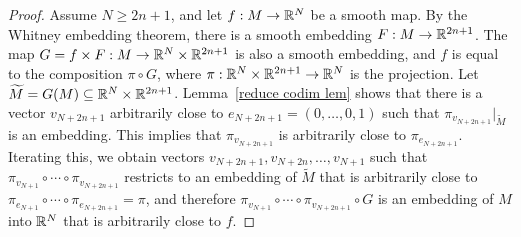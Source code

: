 \begin{proof}
Assume $N\geq2n+1$, and let $f:M\to\mathbb{R}^N$ be a smooth map. By the Whitney embedding theorem, there is a smooth embedding $F:M\to\mathbb{R}^{2n+1}$. The map $G=f\times F:M\to\mathbb{R}^N\times\mathbb{R}^{2n+1}$ is also a smooth embedding, and $f$ is equal to the composition $\pi\circ G$, where $\pi:\mathbb{R}^{N}\times\mathbb{R}^{2n+1}\to\mathbb{R}^N$ is the projection. Let $\widetilde{M}=G(M)\subseteq\mathbb{R}^N\times\mathbb{R}^{2n+1}$. Lemma~\ref{reduce codim lem} shows that there is a vector $v_{N+2n+1}$ arbitrarily close to $e_{N+2n+1}=(0,\dots,0,1)$ such that $\pi_{v_{N+2n+1}}|_{\widetilde{M}}$ is an embedding. This implies that $\pi_{v_{N+2n+1}}$ is arbitrarily close to $\pi_{e_{N+2n+1}}$. Iterating this, we obtain vectors $v_{N+2n+1},v_{N+2n},\dots,v_{N+1}$ such that $\pi_{v_{N+1}}\circ\cdots\circ\pi_{v_{N+2n+1}}$ restricts to an embedding of $\widetilde{M}$ that is arbitrarily close to $\pi_{e_{N+1}}\circ\cdots\circ\pi_{e_{N+2n+1}}=\pi$, and therefore $\pi_{v_{N+1}}\circ\cdots\circ\pi_{v_{N+2n+1}}\circ G$ is an embedding of $M$ into $\mathbb{R}^N$ that is arbitrarily close to $f$.
\end{proof}
